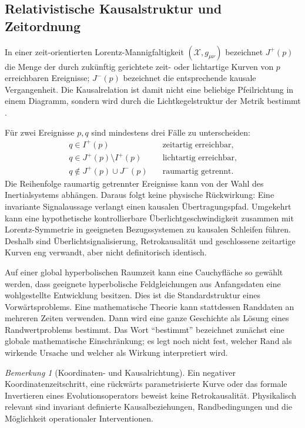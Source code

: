 \documentclass[11pt,a4paper]{article}
\theoremstyle{remark}
\newtheorem{bemerkung}{Bemerkung}[section]
\begin{document}
\subsection{Relativistische Kausalstruktur und Zeitordnung}

In einer zeit-orientierten Lorentz-Mannigfaltigkeit
\((\mathcal X,g_{\mu\nu})\) bezeichnet \(J^+(p)\) die Menge der durch
zukünftig gerichtete zeit- oder lichtartige Kurven von \(p\) erreichbaren
Ereignisse; \(J^-(p)\) bezeichnet die entsprechende kausale Vergangenheit.
Die Kausalrelation ist damit nicht eine beliebige Pfeilrichtung in einem
Diagramm, sondern wird durch die Lichtkegelstruktur der Metrik bestimmt
\citep{wald1984}.

Für zwei Ereignisse \(p,q\) sind mindestens drei Fälle zu unterscheiden:
\begin{align*}
 q\in I^+(p) &\quad\text{zeitartig erreichbar},\\
 q\in J^+(p)\setminus I^+(p) &\quad\text{lichtartig erreichbar},\\
 q\notin J^+(p)\cup J^-(p) &\quad\text{raumartig getrennt}.
\end{align*}
Die Reihenfolge raumartig getrennter Ereignisse kann von der Wahl des
Inertialsystems abhängen. Daraus folgt keine physische Rückwirkung: Eine
invariante Signalaussage verlangt einen kausalen Übertragungspfad. Umgekehrt
kann eine hypothetische kontrollierbare Überlichtgeschwindigkeit zusammen mit
Lorentz-Symmetrie in geeigneten Bezugssystemen zu kausalen Schleifen führen.
Deshalb sind Überlichtsignalisierung, Retrokausalität und geschlossene
zeitartige Kurven eng verwandt, aber nicht definitorisch identisch.

Auf einer global hyperbolischen Raumzeit kann eine Cauchyfläche so gewählt
werden, dass geeignete hyperbolische Feldgleichungen aus Anfangsdaten eine
wohlgestellte Entwicklung besitzen. Dies ist die Standardstruktur eines
Vorwärtsproblems. Eine mathematische Theorie kann stattdessen Randdaten an
mehreren Zeiten verwenden. Dann wird eine ganze Geschichte als Lösung eines
Randwertproblems bestimmt. Das Wort ``bestimmt'' bezeichnet zunächst eine
globale mathematische Einschränkung; es legt noch nicht fest, welcher Rand als
wirkende Ursache und welcher als Wirkung interpretiert wird.

\begin{bemerkung}[Koordinaten- und Kausalrichtung]
Ein negativer Koordinaten\-zeitschritt, eine rückwärts parametrisierte Kurve oder
das formale Invertieren eines Evolutionsoperators beweist keine
Retrokausalität. Physikalisch relevant sind invariant definierte
Kausalbeziehungen, Randbedingungen und die Möglichkeit operationaler
Interventionen.
\end{bemerkung}
\end{document}
